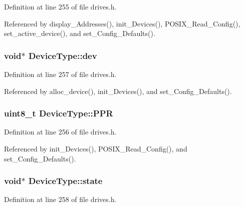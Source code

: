 Definition at line 255 of file drives.\+h.



Referenced by display\+\_\+\+Addresses(), init\+\_\+\+Devices(), P\+O\+S\+I\+X\+\_\+\+Read\+\_\+\+Config(), set\+\_\+active\+\_\+device(), and set\+\_\+\+Config\+\_\+\+Defaults().

\subsubsection[{\texorpdfstring{dev}{dev}}]{\setlength{\rightskip}{0pt plus 5cm}void$\ast$ Device\+Type\+::dev}\hypertarget{structDeviceType_a59fc3b3cb45f8ee0cd1016bd64804d3b}{}\label{structDeviceType_a59fc3b3cb45f8ee0cd1016bd64804d3b}


Definition at line 257 of file drives.\+h.



Referenced by alloc\+\_\+device(), init\+\_\+\+Devices(), and set\+\_\+\+Config\+\_\+\+Defaults().

\subsubsection[{\texorpdfstring{P\+PR}{PPR}}]{\setlength{\rightskip}{0pt plus 5cm}uint8\+\_\+t Device\+Type\+::\+P\+PR}\hypertarget{structDeviceType_ae0e59c6c17582ff80bdab3f2010e8d57}{}\label{structDeviceType_ae0e59c6c17582ff80bdab3f2010e8d57}


Definition at line 256 of file drives.\+h.



Referenced by init\+\_\+\+Devices(), P\+O\+S\+I\+X\+\_\+\+Read\+\_\+\+Config(), and set\+\_\+\+Config\+\_\+\+Defaults().

\subsubsection[{\texorpdfstring{state}{state}}]{\setlength{\rightskip}{0pt plus 5cm}void$\ast$ Device\+Type\+::state}\hypertarget{structDeviceType_ad0fc43d63606bab6c259047e36512e08}{}\label{structDeviceType_ad0fc43d63606bab6c259047e36512e08}


Definition at line 258 of file drives.\+h.



